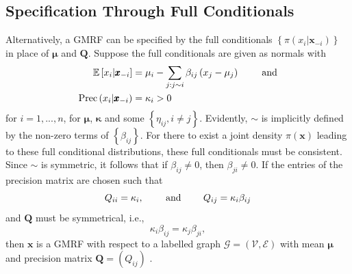 \subsection{Specification Through Full Conditionals}
Alternatively, a GMRF can be specified by the full conditionals $\left\lbrace\pi\left(x_i|\pmb{x}_{-i}\right)\right\rbrace$ in place of $\pmb{\mu}$ and $\pmb{Q}$. Suppose the full conditionals are given as normals with
\begin{align}
    \mathbb{E}\left[x_i|\pmb{x}_{-i}\right] &= \mu_i-\sum_{j:j\sim i}\beta_{ij}\left(x_j-\mu_j\right)\hspace{20pt}\hbox{ and}\\
    \hbox{Prec}\left(x_i|\pmb{x}_{-i}\right) &= \kappa_i>0
\end{align}
for $i=1,...,n$, for $\pmb{\mu}$, $\pmb{\kappa}$ and some $\left\lbrace\eta_{ij},i\neq j\right\rbrace$. Evidently, $\sim$ is implicitly defined by the non-zero terms of $\left\lbrace\beta_{ij}\right\rbrace$. For there to exist a joint density $\pi\left(\pmb{x}\right)$ leading to these full conditional distributions, these full conditionals must be consistent. Since $\sim$ is symmetric, it follows that if $\beta_{ij}\neq 0$, then $\beta_{ji}\neq0$. If the entries of the precision matrix are chosen such that
\begin{equation*}
    Q_{ii}=\kappa_i, \hspace{20pt}\hbox{ and }\hspace{20pt} Q_{ij}=\kappa_i\beta_{ij}
\end{equation*}
and $\pmb{Q}$ must be symmetrical, i.e.,
\begin{equation*}
    \kappa_i\beta_{ij}=\kappa_j\beta_{ji},
\end{equation*}
then $\pmb{x}$ is a GMRF with respect to a labelled graph $\mathcal{G}=\left(\mathcal{V}, \mathcal{E}\right)$ with mean $\pmb{\mu}$ and precision matrix $\pmb{Q}=\left(Q_{ij}\right)$ \autocite[][27]{rue2005gaussian}.
